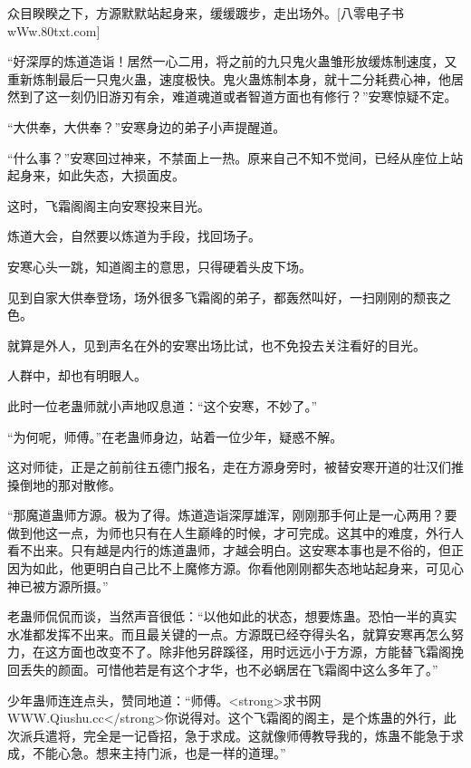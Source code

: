 
\begin{this_body}

众目睽睽之下，方源默默站起身来，缓缓踱步，走出场外。[八零电子书wWw.80txt.com]

“好深厚的炼道造诣！居然一心二用，将之前的九只鬼火蛊雏形放缓炼制速度，又重新炼制最后一只鬼火蛊，速度极快。鬼火蛊炼制本身，就十二分耗费心神，他居然到了这一刻仍旧游刃有余，难道魂道或者智道方面也有修行？”安寒惊疑不定。

“大供奉，大供奉？”安寒身边的弟子小声提醒道。

“什么事？”安寒回过神来，不禁面上一热。原来自己不知不觉间，已经从座位上站起身来，如此失态，大损面皮。

这时，飞霜阁阁主向安寒投来目光。

炼道大会，自然要以炼道为手段，找回场子。

安寒心头一跳，知道阁主的意思，只得硬着头皮下场。

见到自家大供奉登场，场外很多飞霜阁的弟子，都轰然叫好，一扫刚刚的颓丧之色。

就算是外人，见到声名在外的安寒出场比试，也不免投去关注看好的目光。

人群中，却也有明眼人。

此时一位老蛊师就小声地叹息道：“这个安寒，不妙了。”

“为何呢，师傅。”在老蛊师身边，站着一位少年，疑惑不解。

这对师徒，正是之前前往五德门报名，走在方源身旁时，被替安寒开道的壮汉们推搡倒地的那对散修。

“那魔道蛊师方源。极为了得。炼道造诣深厚雄浑，刚刚那手何止是一心两用？要做到他这一点，为师也只有在人生巅峰的时候，才可完成。这其中的难度，外行人看不出来。只有越是内行的炼道蛊师，才越会明白。这安寒本事也是不俗的，但正因为如此，他更明白自己比不上魔修方源。你看他刚刚都失态地站起身来，可见心神已被方源所摄。”

老蛊师侃侃而谈，当然声音很低：“以他如此的状态，想要炼蛊。恐怕一半的真实水准都发挥不出来。而且最关键的一点。方源既已经夺得头名，就算安寒再怎么努力，在这方面也改变不了。除非他另辟蹊径，用时远远小于方源，方能替飞霜阁挽回丢失的颜面。可惜他若是有这个才华，也不必蜗居在飞霜阁中这么多年了。”

少年蛊师连连点头，赞同地道：“师傅。<strong>求书网WWW.Qiushu.cc</strong>你说得对。这个飞霜阁的阁主，是个炼蛊的外行，此次派兵遣将，完全是一记昏招，急于求成。这就像师傅教导我的，炼蛊不能急于求成，不能心急。想来主持门派，也是一样的道理。”


\end{this_body}
